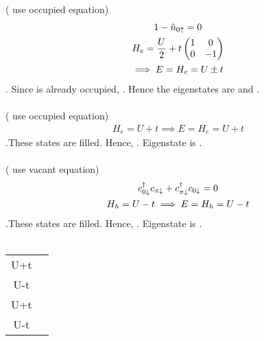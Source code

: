 \documentclass[12pt]{article}
\begin{document}
\subsection{}
 ( use occupied equation)
\begin{gather}
1-\hat n_{0\uparrow} = 0\\
	H_e = \frac{U}{2} + t\begin{pmatrix} 1 & 0 \\ 0 & -1 \end{pmatrix}\\
	\implies E = H_e = U \pm t
\end{gather}
. Since \il{0\ua} is already occupied, . Hence the eigenstates are \il{\ket{\ua\da,\ua}} and \il{\ket{\ua,\ua\da}}.\\\\
 ( use occupied equation)
\begin{gather}
H_e = U+t
\implies E = H_e = U+t
\end{gather}
.These states are filled. Hence, . Eigenstate is \il{\ket{\ua\da,\da}}.\\\\
 ( use vacant equation)
\begin{gather}
c^\dagger_{0\downarrow}c_{\pi\downarrow}+c^\dagger_{\pi\downarrow}c_{0\downarrow}=0\\
H_h = U-t	
\implies E = H_h = U - t
\end{gather}
.These states are filled. Hence, . Eigenstate is \il{\ket{\da,\ua\da}}.\\\\

\begin{table}[tbh!]
	\begin{center}
	\begin{tabular}{|c|c|}
		\hline
		U+t  & \il{\ket{\ua\da,\ua}}\\
		U-t  & \il{\ket{\ua,\ua\da}}\\
		U+t  & \il{\ket{\ua\da,\da}}\\
		U-t  & \il{\ket{\da,\ua\ua}}\\
		\hline
	\end{tabular}
	\end{center}
\end{table}
\end{document}
